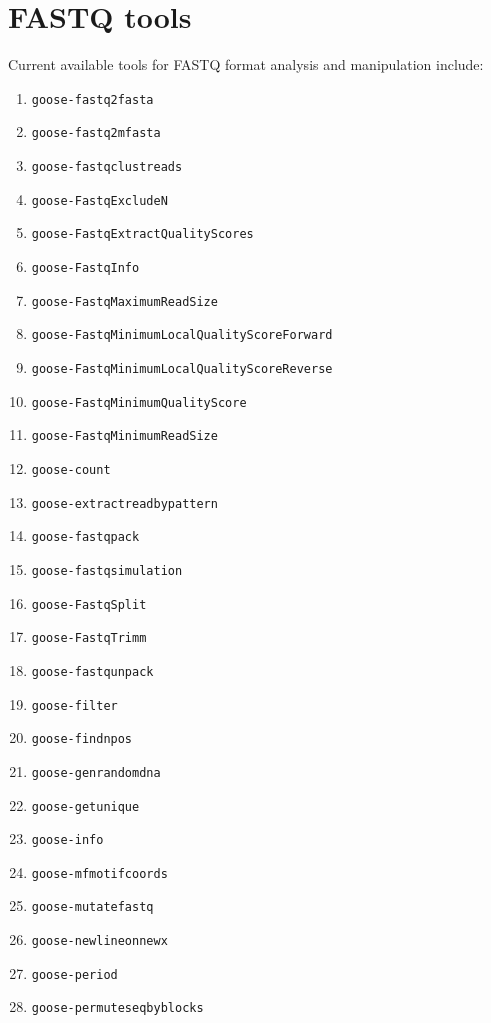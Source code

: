 \chapter{FASTQ tools}
\label{fastq}

Current available tools for FASTQ format analysis and manipulation include:
\begin{enumerate}

\item \texttt{goose-fastq2fasta}
\item \texttt{goose-fastq2mfasta}
\item \texttt{goose-fastqclustreads}
\item \texttt{goose-FastqExcludeN}
\item \texttt{goose-FastqExtractQualityScores}
\item \texttt{goose-FastqInfo}
\item \texttt{goose-FastqMaximumReadSize}
\item \texttt{goose-FastqMinimumLocalQualityScoreForward}
\item \texttt{goose-FastqMinimumLocalQualityScoreReverse}
\item \texttt{goose-FastqMinimumQualityScore}
\item \texttt{goose-FastqMinimumReadSize}

\item \texttt{goose-count}
\item \texttt{goose-extractreadbypattern}

\item \texttt{goose-fastqpack}
\item \texttt{goose-fastqsimulation}
\item \texttt{goose-FastqSplit}
\item \texttt{goose-FastqTrimm}
\item \texttt{goose-fastqunpack}
\item \texttt{goose-filter}
\item \texttt{goose-findnpos}

\item \texttt{goose-genrandomdna}
\item \texttt{goose-getunique}
\item \texttt{goose-info}
\item \texttt{goose-mfmotifcoords}

\item \texttt{goose-mutatefastq}
\item \texttt{goose-newlineonnewx}
\item \texttt{goose-period}
\item \texttt{goose-permuteseqbyblocks}


\end{enumerate}

